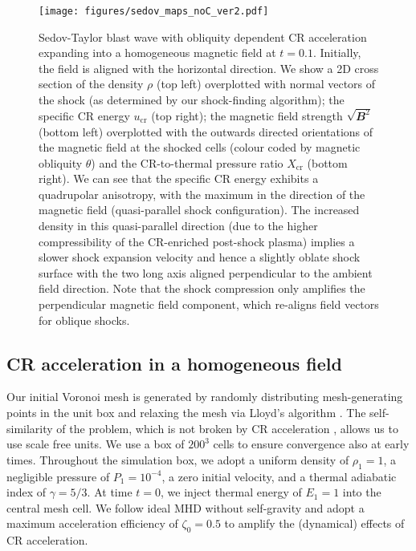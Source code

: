 \documentclass[8pt,a4paper,usenatbib]{mnras}
\newcommand{\vecbf}{\mathbfit}
\begin{document}
\begin{figure*}
\centering
\texttt{[image: figures/sedov\_maps\_noC\_ver2.pdf]} 
\caption{Sedov-Taylor blast wave with obliquity dependent CR acceleration
  expanding into a homogeneous magnetic field at $t=0.1$. Initially, the field
  is aligned with the horizontal direction. We show a 2D cross section of the
  density $\rho$ (top left) overplotted with normal vectors of the shock (as
  determined by our shock-finding algorithm); the specific CR energy
  $u_{\mathrm{cr}}$ (top right); the magnetic field strength
  $\sqrt{\vecbf{B}^2}$ (bottom left) overplotted with the outwards directed
  orientations of the magnetic field at the shocked cells (colour coded by
  magnetic obliquity $\theta$) and the CR-to-thermal pressure ratio
  $X_{\mathrm{cr}}$ (bottom right). We can see that the specific CR energy
  exhibits a quadrupolar anisotropy, with the maximum in the direction of the
  magnetic field (quasi-parallel shock configuration). The increased density in
  this quasi-parallel direction (due to the higher compressibility of the
  CR-enriched post-shock plasma) implies a slower shock expansion velocity and
  hence a slightly oblate shock surface with the two long axis aligned
  perpendicular to the ambient field direction. Note that the shock compression
  only amplifies the perpendicular magnetic field component, which re-aligns
  field vectors for oblique shocks.}
\label{fig5:sedov_maps}
\end{figure*}


\subsection{CR acceleration in a homogeneous field}
\label{sec:homogeneous}

Our initial Voronoi mesh is generated by randomly distributing mesh-generating
points in the unit box and relaxing the mesh via Lloyd's algorithm
\citeyearpar{journals/tit/Lloyd82}. The self-similarity of the problem, which is
not broken by CR acceleration \citep{2017MNRAS.465.4500P}, allows us to use
scale free units. We use a box of $200^3$ cells to ensure convergence also at
early times. Throughout the simulation box, we adopt a uniform density of
$\rho_1 = 1$, a negligible pressure of $P_1 = 10^{-4}$, a zero initial velocity,
and a thermal adiabatic index of $\gamma =5/3$.  At time $t=0$, we inject
thermal energy of $E_1=1$ into the central mesh cell.  We follow ideal MHD
without self-gravity and adopt a maximum acceleration efficiency of
$\zeta_0=0.5$ to amplify the (dynamical) effects of CR acceleration.
\end{document}

